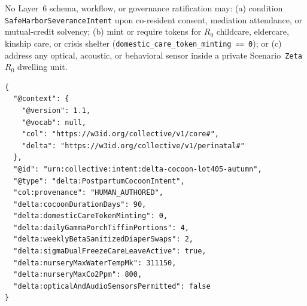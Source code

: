 \begin{invariant}
\label{inv:wave-c-sanctuary-exit}
No Layer~6 schema, workflow, or governance ratification may: (a) condition \texttt{SafeHarborSeveranceIntent} upon co-resident consent, mediation attendance, or mutual-credit solvency; (b) mint or require tokens for $R_0$ childcare, eldercare, kinship care, or crisis shelter (\texttt{domestic\_care\_token\_minting == 0}); or (c) address any optical, acoustic, or behavioral sensor inside a private Scenario~\texttt{Zeta} $R_0$ dwelling unit.
\end{invariant}

\begin{lstlisting}[language=jsonld,caption={Canonical Wave C \texttt{PostpartumCocoonIntent} chaining 90 days of cross-scenario tiffin, diaper, and Care-Leave workflows from a single pre-birth signature.}]
{
  "@context": {
    "@version": 1.1,
    "@vocab": null,
    "col": "https://w3id.org/collective/v1/core#",
    "delta": "https://w3id.org/collective/v1/perinatal#"
  },
  "@id": "urn:collective:intent:delta-cocoon-lot405-autumn",
  "@type": "delta:PostpartumCocoonIntent",
  "col:provenance": "HUMAN_AUTHORED",
  "delta:cocoonDurationDays": 90,
  "delta:domesticCareTokenMinting": 0,
  "delta:dailyGammaPorchTiffinPortions": 4,
  "delta:weeklyBetaSanitizedDiaperSwaps": 2,
  "delta:sigmaDualFreezeCareLeaveActive": true,
  "delta:nurseryMaxWaterTempMk": 311150,
  "delta:nurseryMaxCo2Ppm": 800,
  "delta:opticalAndAudioSensorsPermitted": false
}
\end{lstlisting}

